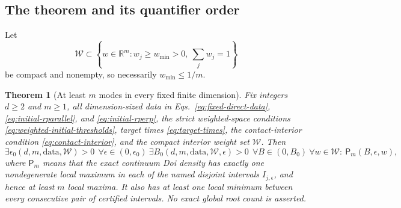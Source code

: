 \documentclass[aps,physrev,onecolumn,amsmath,amssymb,longbibliography]{revtex4-2}
\newcommand{\Wset}{\mathcal W}
\newtheorem{theorem}{Theorem}[section]
\begin{document}
\subsection{The theorem and its quantifier order}

Let
\begin{equation}
 \Wset\subset\left\{w\in\mathbb R^m:
 w_j\ge w_{\min}>0,\ \sum_jw_j=1\right\}
 \label{eq:compact-weight-set}
\end{equation}
be compact and nonempty, so necessarily \(w_{\min}\le1/m\).

\begin{theorem}[At least \(m\) modes in every fixed finite dimension]
\label{thm:fixed-finite-m}
Fix integers \(d\ge2\) and \(m\ge1\), all dimension-sized data in
Eqs.~\eqref{eq:fixed-direct-data}, \eqref{eq:initial-rparallel}, and
\eqref{eq:initial-rperp}, the strict weighted-space conditions
\eqref{eq:weighted-initial-thresholds}, target times
\eqref{eq:target-times}, the contact-interior condition
\eqref{eq:contact-interior}, and the compact interior weight set \(\Wset\).
Then
\begin{equation}
 \boxed{
 \exists\epsilon_0(d,m,\text{data},\Wset)>0\
 \ \forall\epsilon\in(0,\epsilon_0)\ 
 \exists B_0(d,m,\text{data},\Wset,\epsilon)>0\
 \ \forall B\in(0,B_0)\ 
 \forall w\in\Wset:\ \mathsf P_m(B,\epsilon,w),}
 \label{eq:nested-quantifiers}
\end{equation}
where \(\mathsf P_m\) means that the exact continuum Doi density has exactly
one nondegenerate local maximum in each of the named disjoint intervals
\(I_{j,\epsilon}\), and hence at least \(m\) local maxima.  It also has at
least one local minimum between every consecutive pair of certified intervals.
No exact global root count is asserted.
\end{theorem}
\end{document}
